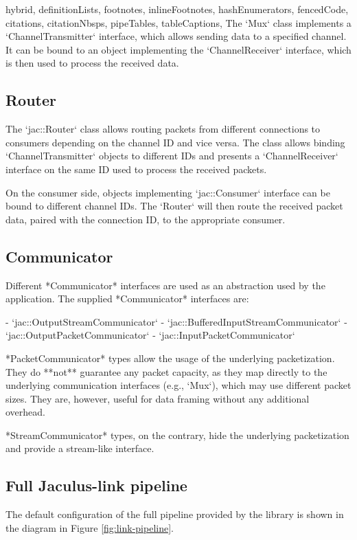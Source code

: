 \documentclass[
  digital,
  oneside,
  nosansbold,
  nocolorbold,
  lof,
  lot
]{fithesis4}
\begin{document}
\begin{markdown*}{%
  hybrid,
  definitionLists,
  footnotes,
  inlineFootnotes,
  hashEnumerators,
  fencedCode,
  citations,
  citationNbsps,
  pipeTables,
  tableCaptions,
}
The `Mux` class implements a `ChannelTransmitter` interface, which allows sending data to a specified channel. It can be bound to an object implementing the `ChannelReceiver` interface, which is then used to process the received data.

\subsection{Router}

The `jac::Router` class allows routing packets from different connections to consumers depending on the channel ID and vice versa. The class allows binding `ChannelTransmitter` objects to different IDs and presents a `ChannelReceiver` interface on the same ID used to process the received packets.

On the consumer side, objects implementing `jac::Consumer` interface can be bound to different channel IDs. The `Router` will then route the received packet data, paired with the connection ID, to the appropriate consumer.

\subsection{Communicator}

Different *Communicator* interfaces are used as an abstraction used by the application. The supplied *Communicator* interfaces are:

  - `jac::OutputStreamCommunicator`
  - `jac::BufferedInputStreamCommunicator`
  - `jac::OutputPacketCommunicator`
  - `jac::InputPacketCommunicator`

*PacketCommunicator* types allow the usage of the underlying packetization. They do **not** guarantee any packet capacity, as they map directly to the underlying communication interfaces (e.g., `Mux`), which may use different packet sizes. They are, however, useful for data framing without any additional overhead.

*StreamCommunicator* types, on the contrary, hide the underlying packetization and provide a stream-like interface.

\subsection{Full Jaculus-link pipeline}

The default configuration of the full pipeline provided by the library is shown in the diagram in Figure \ref{fig:link-pipeline}.


\end{markdown*}
\end{document}
